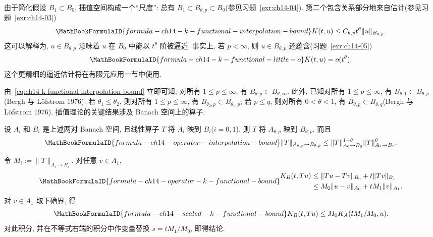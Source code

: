 由于简化假设 $B_1\subset B_0$, 插值空间构成一个``尺度'': 总有 $B_1\subset B_{\theta,p}\subset B_0$(参见习题~\ref{exr:ch14-04}). 第二个包含关系部分地来自估计(参见习题~\ref{exr:ch14-03})
\begin{equation}
\MathBookFormulaID{formula-ch14-k-functional-interpolation-bound}
\label{eq:ch14-k-functional-interpolation-bound}
K(t,u)\leq C_{\theta,p}t^\theta\|u\|_{B_{\theta,p}}.
\end{equation}
这可以解释为, $u\in B_{\theta,p}$ 意味着 $u$ 在 $B_0$ 中能以 $t^\theta$ 阶被逼近. 事实上, 若 $p<\infty$, 则 $u\in B_{\theta,p}$ 还蕴含(习题~\ref{exr:ch14-05})
\begin{equation}
\MathBookFormulaID{formula-ch14-k-functional-little-o}
\label{eq:ch14-k-functional-little-o}
K(t,u)=o(t^\theta).
\end{equation}
这个更精细的逼近估计将在有限元应用一节中使用.

由~\eqref{eq:ch14-k-functional-interpolation-bound} 立即可知, 对所有 $1\leq p\leq\infty$, 有 $B_{\theta,p}\subset B_{\theta,\infty}$. 此外, 已知对所有 $1\leq p\leq\infty$, 有 $B_{\theta,1}\subset B_{\theta,p}$(Bergh 与 Löfstrom 1976). 若 $\theta_1\leq\theta_2$, 则对所有 $1\leq p\leq\infty$, 有 $B_{\theta_2,p}\subset B_{\theta_1,p}$; 若 $p\leq q$, 则对所有 $0<\theta<1$, 有 $B_{\theta,p}\subset B_{\theta,q}$(Bergh 与 Löfstrom 1976).
插值理论的关键结果涉及 Banach 空间上的算子.

\begin{Proposition}
\label{prop:ch14-operator-interpolation}
设 $A_i$ 和 $B_i$ 是上述两对 Banach 空间, 且线性算子 $T$ 将 $A_i$ 映到 $B_i$($i=0,1$). 则 $T$ 将 $A_{\theta,p}$ 映到 $B_{\theta,p}$. 而且
\begin{equation}
\MathBookFormulaID{formula-ch14-operator-interpolation-bound}
\label{eq:ch14-operator-interpolation-bound}
\|T\|_{A_{\theta,p}\to B_{\theta,p}}
\leq \|T\|_{A_0\to B_0}^{1-\theta}\|T\|_{A_1\to B_1}^{\theta}.
\end{equation}
\end{Proposition}

\begin{Proof}
令 $M_i:=\|T\|_{A_i\to B_i}$. 对任意 $v\in A_1$,
\[
\MathBookFormulaID{formula-ch14-operator-k-functional-bound}
\begin{aligned}
K_B(t,Tu)&\leq\|Tu-Tv\|_{B_0}+t\|Tv\|_{B_1}\\
&\leq M_0\|u-v\|_{A_0}+tM_1\|v\|_{A_1}.
\end{aligned}
\]
对 $v\in A_1$ 取下确界, 得
\[
\MathBookFormulaID{formula-ch14-scaled-k-functional-bound}
K_B(t,Tu)\leq M_0K_A(tM_1/M_0,u).
\]
对此积分, 并在不等式右端的积分中作变量替换 $s=tM_1/M_0$, 即得结论.
\end{Proof}

